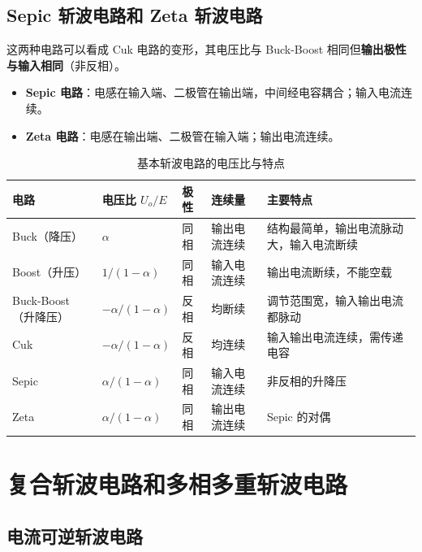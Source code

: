 \subsection{Sepic 斩波电路和 Zeta 斩波电路}

这两种电路可以看成 Cuk 电路的变形，其电压比与 Buck-Boost 相同但\textbf{输出极性与输入相同}（非反相）。


\begin{itemize}
  \item \textbf{Sepic 电路}：电感在输入端、二极管在输出端，中间经电容耦合；输入电流连续。
  \item \textbf{Zeta 电路}：电感在输出端、二极管在输入端；输出电流连续。
\end{itemize}

\begin{table}[htbp]
\centering
\caption{基本斩波电路的电压比与特点}
\label{tab:5-1}
\begin{tabular}{p{2.6cm}p{3.4cm}p{1.6cm}p{2.4cm}p{3.6cm}}
\toprule
\textbf{电路} & \textbf{电压比 $U_o/E$} & \textbf{极性} & \textbf{连续量} & \textbf{主要特点} \\
\midrule
Buck（降压） & $\alpha$ & 同相 & 输出电流连续 & 结构最简单，输出电流脉动大，输入电流断续 \\
Boost（升压） & $1/(1-\alpha)$ & 同相 & 输入电流连续 & 输出电流断续，不能空载 \\
Buck-Boost（升降压） & $-\alpha/(1-\alpha)$ & 反相 & 均断续 & 调节范围宽，输入输出电流都脉动 \\
Cuk & $-\alpha/(1-\alpha)$ & 反相 & 均连续 & 输入输出电流连续，需传递电容 \\
Sepic & $\alpha/(1-\alpha)$ & 同相 & 输入电流连续 & 非反相的升降压 \\
Zeta & $\alpha/(1-\alpha)$ & 同相 & 输出电流连续 & Sepic 的对偶 \\
\bottomrule
\end{tabular}
\end{table}

\section{复合斩波电路和多相多重斩波电路}

\subsection{电流可逆斩波电路}


